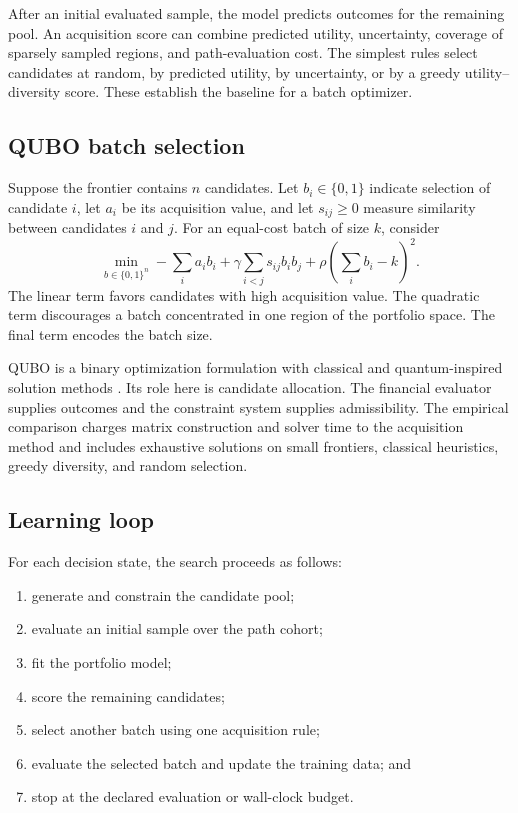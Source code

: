 \documentclass{strategynet-journal}
\begin{document}
After an initial evaluated sample, the model predicts outcomes for the
remaining pool.  An acquisition score can combine predicted utility,
uncertainty, coverage of sparsely sampled regions, and path-evaluation cost.
The simplest rules select candidates at random, by predicted utility, by
uncertainty, or by a greedy utility--diversity score.  These establish the
baseline for a batch optimizer.

\subsection{QUBO batch selection}

Suppose the frontier contains \(n\) candidates.  Let \(b_i\in\{0,1\}\) indicate
selection of candidate \(i\), let \(a_i\) be its acquisition value, and let
\(s_{ij}\geq0\) measure similarity between candidates \(i\) and \(j\).  For an
equal-cost batch of size \(k\), consider
\[
  \min_{b\in\{0,1\}^n}
  -\sum_i a_i b_i
  +\gamma\sum_{i<j}s_{ij}b_ib_j
  +\rho\left(\sum_i b_i-k\right)^2.
\]
The linear term favors candidates with high acquisition value.  The quadratic
term discourages a batch concentrated in one region of the portfolio space.
The final term encodes the batch size.

QUBO is a binary optimization formulation with classical and
quantum-inspired solution methods \cite{qubo}.  Its role here is candidate
allocation.  The financial evaluator supplies outcomes and the constraint
system supplies admissibility.  The empirical comparison charges matrix
construction and solver time to the acquisition method and includes exhaustive
solutions on small frontiers, classical heuristics, greedy diversity, and
random selection.

\subsection{Learning loop}

For each decision state, the search proceeds as follows:

\begin{enumerate}
  \item generate and constrain the candidate pool;
  \item evaluate an initial sample over the path cohort;
  \item fit the portfolio model;
  \item score the remaining candidates;
  \item select another batch using one acquisition rule;
  \item evaluate the selected batch and update the training data; and
  \item stop at the declared evaluation or wall-clock budget.
\end{enumerate}
\end{document}
